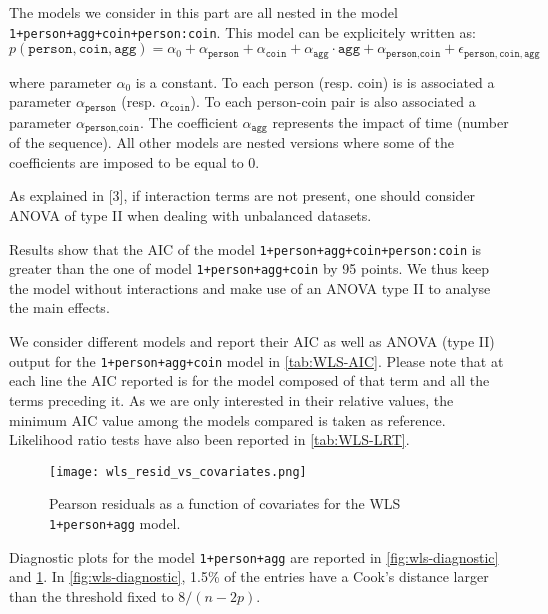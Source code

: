 \documentclass[a4paper, 12pt,oneside]{article}
\begin{document}
			The models we consider in this part are all nested in the model \texttt{1+person+agg+coin+person:coin}.
			This model can be explicitely written as: 
			\begin{equation}
				\label{eq:wls_model}
				p(\texttt{person},\texttt{coin},\texttt{agg}) = \alpha_0 + \alpha_{\texttt{person}}+\alpha_{\texttt{coin}} +\alpha_{\texttt{agg}}\cdot\texttt{agg} +\alpha_{\texttt{person},\texttt{coin}} + \epsilon_{\texttt{person},\texttt{coin},\texttt{agg}}
			\end{equation}

			where parameter $\alpha_0$ is a constant. To each person (resp. coin) is is associated a parameter
			$\alpha_{\texttt{person}}$ (resp. $\alpha_{\texttt{coin}}$). To each person-coin pair is also associated a parameter $\alpha_{\texttt{person},\texttt{coin}}$. The coefficient $\alpha_{\texttt{agg}}$ represents the impact of time (number of the sequence). All other models are nested versions where some of the coefficients are imposed to be equal to 0.

			
			As explained in [3], if interaction terms are not present, one should consider ANOVA of type II when dealing with unbalanced datasets.

			Results show that the AIC of the model \texttt{1+person+agg+coin+person:coin} is greater than the one of model \texttt{1+person+agg+coin} by 95 points. We thus keep the model without interactions and make use of an ANOVA type II to analyse the main effects. 

			We consider different models and report their AIC as well as  ANOVA (type II) output for the \texttt{1+person+agg+coin} model in \ref{tab:WLS-AIC}. Please note that at each line the AIC reported is for the model composed of that term and all the terms preceding it. As we are only interested in their relative values, the minimum AIC value among the models compared is taken as reference. 
			Likelihood ratio tests have also been reported in \ref{tab:WLS-LRT}.
			\begin{figure}[htb]
				\vspace{-1em}
				\centering
				\texttt{[image: wls\_resid\_vs\_covariates.png]}
				\caption{Pearson residuals as a function of covariates for the WLS \texttt{1+person+agg} model.}
				\label{fig:wls-diagnostic-time-coefs}
			\end{figure}

			Diagnostic plots for the model \texttt{1+person+agg} are reported in \ref{fig:wls-diagnostic} and \ref{fig:wls-diagnostic-time-coefs}. In \ref{fig:wls-diagnostic}, 1.5\% of the entries have a Cook's distance larger than the threshold fixed to $8/(n-2p)$. 
\end{document}
